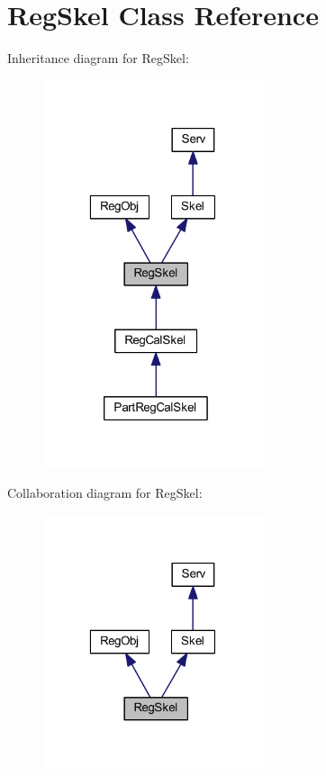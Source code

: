 \hypertarget{class_reg_skel}{
\section{RegSkel Class Reference}
\label{class_reg_skel}
}


Inheritance diagram for RegSkel:\nopagebreak
\begin{figure}[H]
\begin{center}
\leavevmode
\includegraphics[width=183pt]{class_reg_skel__inherit__graph}
\end{center}
\end{figure}


Collaboration diagram for RegSkel:\nopagebreak
\begin{figure}[H]
\begin{center}
\leavevmode
\includegraphics[width=183pt]{class_reg_skel__coll__graph}
\end{center}
\end{figure}
